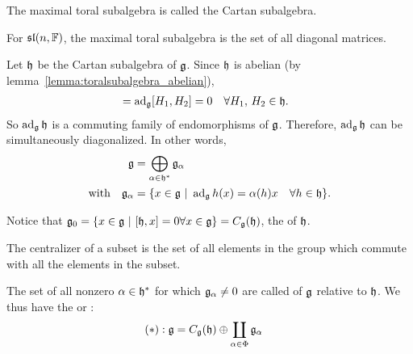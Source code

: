 \begin{definition}
    The maximal toral subalgebra  is called the Cartan subalgebra.
\end{definition}

\begin{insight}
   For $\Lie {sl}(n,\FF)$, the maximal toral subalgebra is the set of all diagonal matrices.
\end{insight}
Let $\mathfrak{h}$ be the Cartan subalgebra of $\mathfrak{g}$. Since $\mathfrak{h}$ is abelian (by lemma~\ref{lemma:toralsubalgebra_abelian}), 
\begin{align}
    [\ad_\Lie g H_1, \ad_\Lie g H_2] &= \ad_\Lie g [H_1, H_2] =0  \quad \forall H_1,\, H_2 \in \LieH.
\end{align}
So $\ad_\Lie g \Lie h$ is a commuting family of endomorphisms of $\mathfrak{g}$. Therefore, $\operatorname{ad}_{\mathfrak{g}}\mathfrak{h}$ can be simultaneously diagonalized. In other words,
\begin{align}
    \mathfrak{g} &= \bigoplus_{\alpha\in \mathfrak{h}^*} \mathfrak{g}_\alpha \\
    \text{with}\quad \mathfrak{g}_\alpha &= \{x\in \mathfrak{g}\ |\ \operatorname{ad}_{\mathfrak{g}} h (x)=\alpha(h)x \quad\forall h\in \mathfrak{h}\}.
\end{align}

Notice that $\LieG_0 = \{x\in\LieG\ |\ [\LieH,x] = 0 \forall x\in\LieG\} = C_\LieG(\LieH)$, the  of $\mathfrak{h}$. 
\begin{insight}
    The centralizer of a subset is the set of all elements in the group which commute with all the elements in the subset.
\end{insight}

The set of all nonzero $\alpha\in\mathfrak{h}^*$ for which $\mathfrak{g}_\alpha \neq 0$ are called  of $\mathfrak{g}$ relative to $\mathfrak{h}$. We thus have the  or : 
\begin{align}
    (*): \mathfrak{g} &= C_{\mathfrak{g}}(\mathfrak{h}) \oplus \coprod_{\alpha\in\Phi} \mathfrak{g}_\alpha
\end{align}

